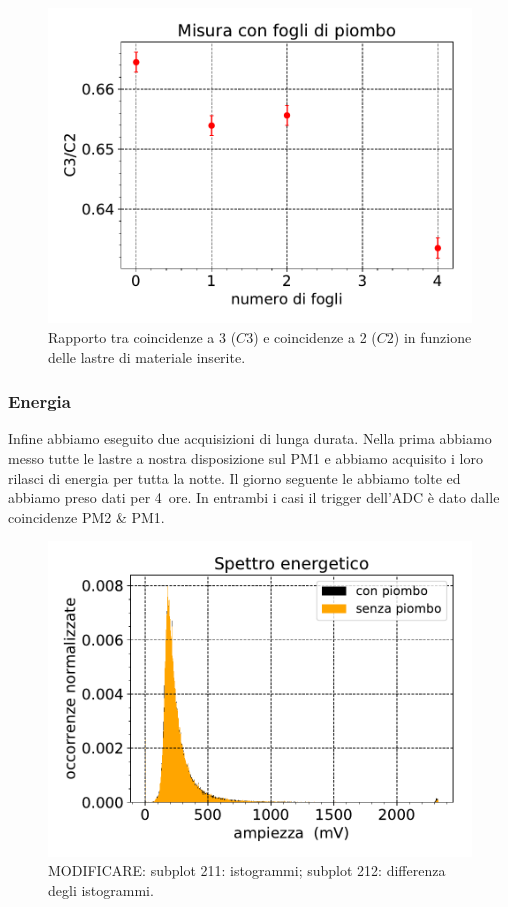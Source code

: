 \begin{figure}[h]
\centering
\includegraphics[width=8 cm]{confronto}
\caption{Rapporto tra coincidenze a 3 ($C3$) e coincidenze a 2 ($C2$) in funzione delle lastre di materiale inserite.}
\label{cfr}
\end{figure}

\subsubsection{Energia}

Infine abbiamo eseguito due acquisizioni di lunga durata.
Nella prima abbiamo messo tutte le lastre a nostra disposizione sul PM1
e abbiamo acquisito i loro rilasci di energia per tutta la notte.
Il giorno seguente le abbiamo tolte ed abbiamo preso dati per \SI{4}{ore}.
In entrambi i casi il trigger dell'ADC è dato dalle coincidenze PM2 \& PM1.

\begin{figure}[h]
\centering
\includegraphics[width=8 cm]{gemelli}
\caption{MODIFICARE:
subplot 211: istogrammi;
subplot 212: differenza degli istogrammi.}
\label{gemini}    
\end{figure}
